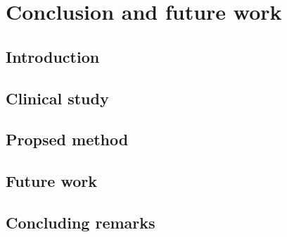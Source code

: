 \chapter{Conclusion and future work}
\label{chapter:conclusion} 


\section{Introduction}

\lipsum[2-4]

\section{Clinical study}

\lipsum[2-4]

\section{Propsed method}

\lipsum[2-4]

\section{Future work}

\lipsum[2-4]

\section{Concluding remarks}

\lipsum[2-4]
